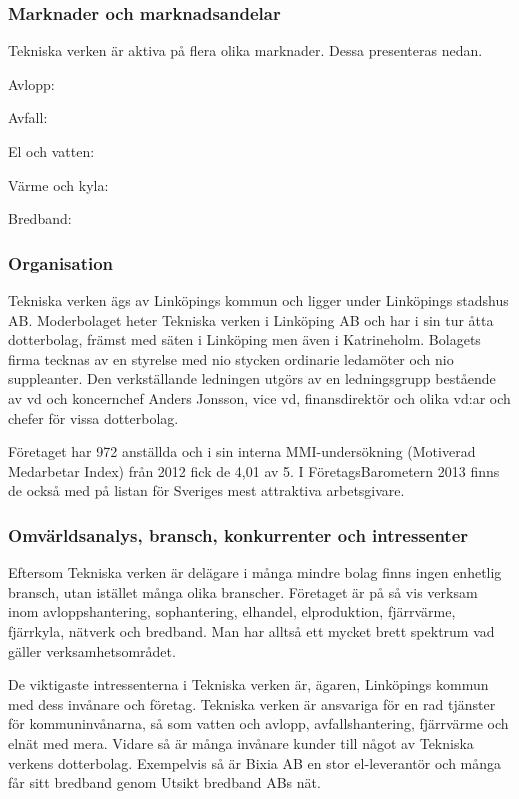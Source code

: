 \documentclass[10pt,a4paper]{article}
\begin{document}

\subsubsection{Marknader och marknadsandelar}
Tekniska verken är aktiva på flera olika marknader. Dessa presenteras nedan.

Avlopp:

Avfall:

El och vatten:

Värme och kyla: 

Bredband:

\subsubsection{Organisation}
Tekniska verken ägs av Linköpings kommun och ligger under Linköpings stadshus AB. Moderbolaget heter Tekniska verken i Linköping AB och har i sin tur åtta dotterbolag, främst med säten i Linköping men även i Katrineholm.  Bolagets firma tecknas av en styrelse med nio stycken ordinarie ledamöter och nio suppleanter. Den verkställande ledningen utgörs av en ledningsgrupp bestående av vd och koncernchef Anders Jonsson, vice vd, finansdirektör och olika vd:ar och chefer för vissa dotterbolag. 

Företaget har 972 anställda och i sin interna MMI-undersökning (Motiverad Medarbetar Index) från 2012 fick de 4,01 av 5. I FöretagsBarometern 2013 finns de också med på listan för Sveriges mest attraktiva arbetsgivare. 

\subsubsection{Omvärldsanalys, bransch, konkurrenter och intressenter}

Eftersom Tekniska verken är delägare i många mindre bolag finns ingen enhetlig 
bransch, utan istället många olika branscher. Företaget är på så vis verksam inom
avloppshantering, sophantering, elhandel, elproduktion, fjärrvärme, fjärrkyla, 
nätverk och bredband. Man har alltså ett mycket brett spektrum vad gäller 
verksamhetsområdet.


De viktigaste intressenterna i Tekniska verken är, ägaren, Linköpings kommun
med dess invånare och företag. Tekniska verken är ansvariga för en rad tjänster
för kommuninvånarna, så som vatten och avlopp, avfallshantering, fjärrvärme och
elnät med mera. Vidare så är många invånare kunder till något av Tekniska
verkens dotterbolag. Exempelvis så är Bixia AB en stor el-leverantör och många
får sitt bredband genom Utsikt bredband ABs nät.
\end{document}
